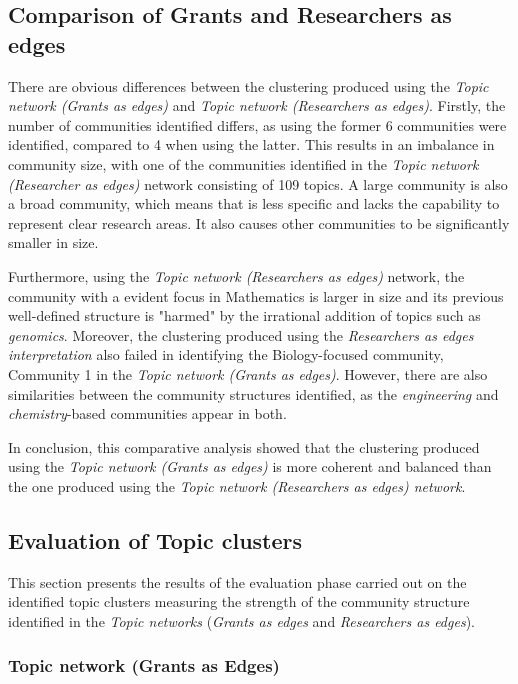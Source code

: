 {\subsection{Comparison of Grants and Researchers as edges}

There are obvious differences between the clustering produced using the \textit{Topic network (Grants as edges)} and \textit{Topic network (Researchers as edges)}. Firstly, the number of communities identified differs, as using the former 6 communities were identified, compared to 4 when using the latter. This results in an imbalance in community size, with one of the communities identified in the \textit{Topic network (Researcher as edges)} network consisting of 109 topics. A large community is also a broad community, which means that is less specific and lacks the capability to represent clear research areas. It also causes other communities to be significantly smaller in size.

Furthermore, using the \textit{Topic network (Researchers as edges)} network, the community with a evident focus in Mathematics is larger in size and its previous well-defined structure is "harmed" by the irrational addition of topics such as \textit{genomics}. Moreover, the clustering produced using the \textit{Researchers as edges interpretation} also failed in identifying the Biology-focused community, Community 1 in the \textit{Topic network (Grants as edges)}. However, there are also similarities between the community structures identified, as the \textit{engineering} and \textit{chemistry}-based communities appear in both.

In conclusion, this comparative analysis showed that the clustering produced using the \textit{Topic network (Grants as edges)} is more coherent and balanced than the one produced using the \textit{Topic network (Researchers as edges) network}.

\subsection{Evaluation of Topic clusters}

This section presents the results of the evaluation phase carried out on the identified topic clusters measuring the strength of the community structure identified in the \textit{Topic networks} (\textit{Grants as edges} and \textit{Researchers as edges}).

\subsubsection{Topic network (Grants as Edges)}

}
